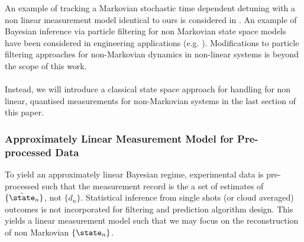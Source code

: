 An example of tracking a Markovian stochastic time dependent detuning with a non linear measurement model identical to ours is considered in \cite{wiebe2015bayesian}. An example of Bayesian inference via particle filtering for non Markovian state space models have been considered in engineering applications (e.g. \cite{jacob2016}). Modifications to particle filtering approaches for non-Markovian dynamics in non-linear systems is beyond the scope of this work.  
\\
\\
Instead, we will introduce a classical state space approach for handling for non linear, quantised measurements for non-Markovian systems in the last section of this paper. 

\subsubsection{Approximately Linear Measurement Model for Pre-processed Data}
To yield an approximately linear Bayesian regime,  experimental data is pre-processed such that the measurement record is the a set of estimates of $\{\hat{\state}_n\}$, not $\{d_n\}$.  Statistical inference from single shots (or cloud averaged) outcomes is not incorporated for filtering and prediction algorithm design. This yields a linear measurement model such that we may focus on the reconstruction of non Markovian $\{\state_n\}$. 



